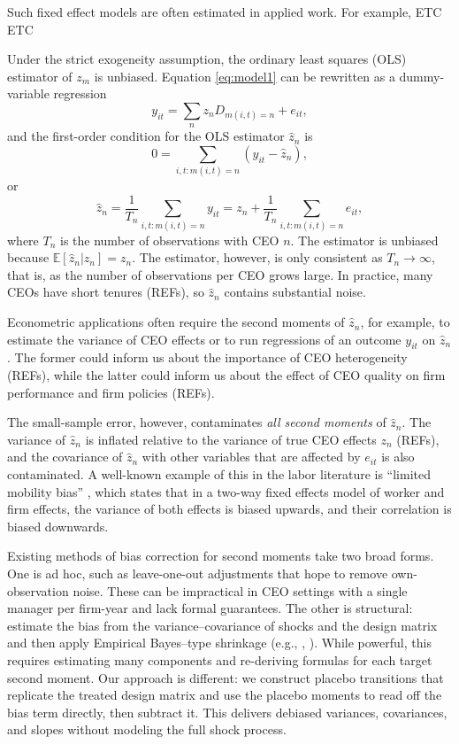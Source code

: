 \documentclass[11pt,a4paper]{article}
\begin{document}
Such fixed effect models are often estimated in applied work. For example, \citet{Bertrand2003-io} ETC ETC

Under the strict exogeneity assumption, the ordinary least squares (OLS) estimator of $z_m$ is unbiased. Equation \eqref{eq:model1} can be rewritten as a dummy-variable regression 
$$
y_{it} = \sum_{n} z_n D_{m(i,t)=n}  + e_{it},
$$
and the first-order condition for the OLS estimator $\hat z_n$ is
$$
0 = \sum_{i,t:m(i,t)=n} (y_{it} - \hat z_n),
$$
or 
$$
\hat z_n = \frac{1}{T_n} \sum_{i,t:m(i,t)=n} y_{it} = z_n + \frac{1}{T_n} \sum_{i,t:m(i,t)=n} e_{it},
$$
where $T_n$ is the number of observations with CEO $n$. The estimator is unbiased because $\mathbb E[\hat z_n|z_n] = z_n$. The estimator, however, is only consistent as $T_n\to\infty$, that is, as the number of observations per CEO grows large. In practice, many CEOs have short tenures (REFs), so $\hat z_n$ contains substantial noise. 

Econometric applications often require the second moments of $\hat z_n$, for example, to estimate the variance of CEO effects or to run regressions of an outcome $y_{it}$ on $\hat z_n$. The former could inform us about the importance of CEO heterogeneity (REFs), while the latter could inform us about the effect of CEO quality on firm performance and firm policies (REFs). 

The small-sample error, however, contaminates \emph{all second moments} of $\hat z_n$. The variance of $\hat z_n$ is inflated relative to the variance of true CEO effects $z_n$ (REFs), and the covariance of $\hat z_n$ with other variables that are affected by $e_{it}$ is also contaminated. A well-known example of this in the labor literature is ``limited mobility bias'' \citep{andrews2008high}, which states that in a two-way fixed effects model of worker and firm effects, the variance of both effects is biased upwards, and their correlation is biased downwards.

Existing methods of bias correction for second moments take two broad forms. One is ad hoc, such as leave-one-out adjustments that hope to remove own-observation noise. These can be impractical in CEO settings with a single manager per firm-year and lack formal guarantees. The other is structural: estimate the bias from the variance–covariance of shocks and the design matrix and then apply Empirical Bayes–type shrinkage (e.g., \citealt{andrews2008high}, \citealt{Bonhomme2023-dx}). While powerful, this requires estimating many components and re-deriving formulas for each target second moment. Our approach is different: we construct placebo transitions that replicate the treated design matrix and use the placebo moments to read off the bias term directly, then subtract it. This delivers debiased variances, covariances, and slopes without modeling the full shock process.
\end{document}
